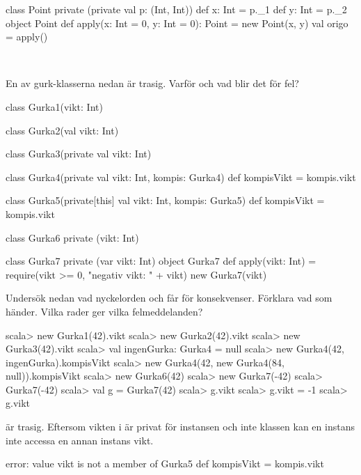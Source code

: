 \SubtaskSolved

\begin{Code}
class Point private (private val p: (Int, Int)) {
  def x: Int = p._1
  def y: Int = p._2
}
object Point {
  def apply(x: Int = 0, y: Int = 0): Point = new Point(x, y)
  val origo = apply()
}
\end{Code}

\QUESTEND




\QUESTBEGIN

\Task  \what~

\Subtask En av gurk-klasserna nedan är trasig. Varför och vad blir det för fel?

\begin{Code}
class Gurka1(vikt: Int)

class Gurka2(val vikt: Int)

class Gurka3(private val vikt: Int)

class Gurka4(private val vikt: Int, kompis: Gurka4){
  def kompisVikt = kompis.vikt
}

class Gurka5(private[this] val vikt: Int, kompis: Gurka5){
  def kompisVikt = kompis.vikt
}

class Gurka6 private (vikt: Int)

class Gurka7 private (var vikt: Int)
object Gurka7 {
  def apply(vikt: Int) = {
    require(vikt >= 0, "negativ vikt: " + vikt)
    new Gurka7(vikt)
  }
}
\end{Code}

\Subtask Undersök nedan vad nyckelorden  och  får för konsekvenser. Förklara vad som händer. Vilka rader ger vilka felmeddelanden?

\begin{REPL}
scala> new Gurka1(42).vikt
scala> new Gurka2(42).vikt
scala> new Gurka3(42).vikt
scala> val ingenGurka: Gurka4 = null
scala> new Gurka4(42, ingenGurka).kompisVikt
scala> new Gurka4(42, new Gurka4(84, null)).kompisVikt
scala> new Gurka6(42)
scala> new Gurka7(-42)
scala> Gurka7(-42)
scala> val g = Gurka7(42)
scala> g.vikt
scala> g.vikt = -1
scala> g.vikt
\end{REPL}


\SOLUTION


\TaskSolved \what

\SubtaskSolved {} är trasig. Eftersom vikten i  är privat för instansen och inte klassen kan en instans inte accessa en annan instans vikt.
\begin{REPL}
  error: value vikt is not a member of Gurka5
  def kompisVikt = kompis.vikt
\end{REPL}


